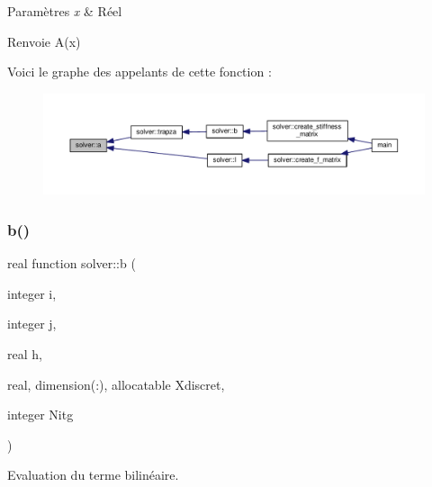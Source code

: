 \begin{DoxyParams}{Paramètres}
{\em x} & Réel \\
\hline
\end{DoxyParams}
\begin{DoxyReturn}{Renvoie}
A(x) 
\end{DoxyReturn}
Voici le graphe des appelants de cette fonction \+:
\nopagebreak
\begin{figure}[H]
\begin{center}
\leavevmode
\includegraphics[width=350pt]{namespacesolver_ab0081bb7880652eb26e65994f13fcb54_icgraph}
\end{center}
\end{figure}
\mbox{\label{namespacesolver_a99565d1c8ed5142211b78fe3ccca060b}} 
\subsubsection{\texorpdfstring{b()}{b()}}
{\footnotesize\ttfamily real function solver\+::b (\begin{DoxyParamCaption}\item[{integer}]{i,  }\item[{integer}]{j,  }\item[{real}]{h,  }\item[{real, dimension(\+:), allocatable}]{Xdiscret,  }\item[{integer}]{Nitg }\end{DoxyParamCaption})}



Evaluation du terme bilinéaire. 


